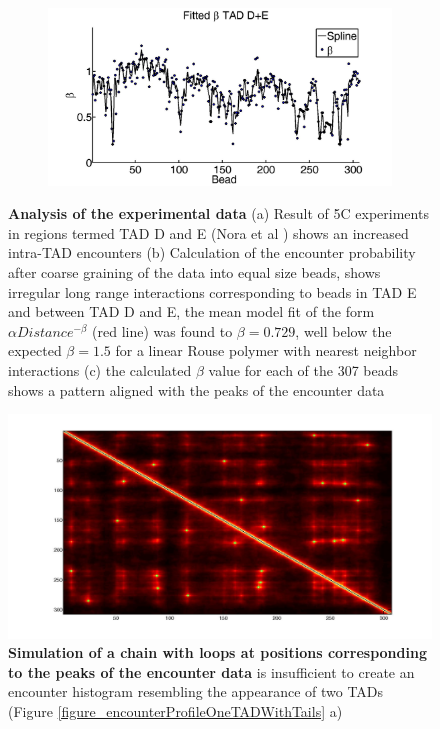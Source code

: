 \documentclass[12pt]{article}
\begin{document}
\begin{figure}[H]
\begin{subfigure}[b]{0.1\textwidth}
\includegraphics[scale=0.16]{fittedExpValuesWithSplineAverageTADDAndE}
\caption{}
\end{subfigure}

\caption{\textbf{Analysis of the experimental data} (a) Result of 5C experiments in regions termed TAD D and E (Nora et al \cite{Nora2012}) shows an increased intra-TAD encounters (b) Calculation of the encounter probability after coarse graining of the data into equal size beads, shows irregular long range interactions corresponding to beads in TAD E and between TAD D and E, the mean model fit of the form $\alpha Distance ^{-\beta}$ (red line) was found to $\beta=0.729$, well below the expected $\beta=1.5$ for a linear Rouse polymer with nearest neighbor interactions (c) the calculated $\beta$ value for each of the 307 beads shows a pattern aligned with the peaks of the encounter data}
\label{figure_TADDAndENoraEtAl2012}
\end{figure}


\begin{figure}[H]
\includegraphics[scale=0.2]{meanEncounterMatrixOfSimulatingTADEandDWithLoops}
\caption{\textbf{Simulation of a chain with loops at positions corresponding to the peaks of the encounter data} is insufficient to create an encounter histogram resembling the appearance of two TADs (Figure \ref{figure_encounterProfileOneTADWithTails} a) }
\label{figure_encounterProbabilityPeaksOfTheEncounterData}
\end{figure}
\end{document}
